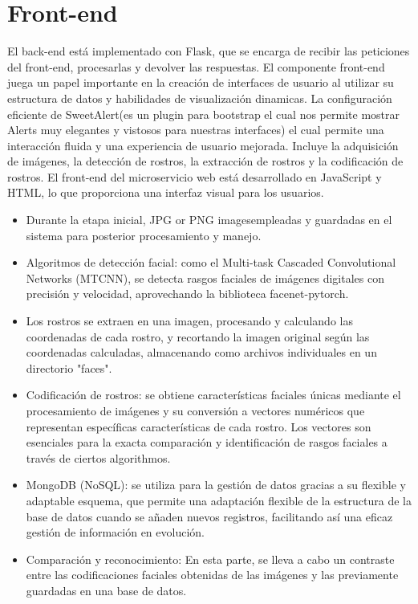 \documentclass[12pt]{article}
\begin{document}
\section{Front-end}
El back-end está implementado con Flask, que se encarga de recibir las peticiones del front-end, procesarlas y devolver las respuestas.
El componente front-end juega un papel importante en la creación de interfaces de usuario al utilizar su estructura de datos y habilidades de visualización dinamicas. La configuración eficiente de SweetAlert(es un plugin para bootstrap el cual nos permite mostrar Alerts muy elegantes y vistosos para nuestras interfaces) el cual permite una interacción fluida y una experiencia de usuario mejorada. Incluye la adquisición de imágenes, la detección de rostros, la extracción de rostros y la codificación de rostros.
El front-end del microservicio web está desarrollado en JavaScript y HTML, lo que proporciona una interfaz visual para los usuarios.
\begin{itemize}
    \item Durante la etapa inicial, JPG or PNG imagesempleadas y guardadas en el sistema para posterior procesamiento y manejo.
    \item Algoritmos de detección facial: como el Multi-task Cascaded Convolutional Networks (MTCNN), se detecta rasgos faciales de imágenes digitales con precisión y velocidad, aprovechando la biblioteca facenet-pytorch.
    \item Los rostros se extraen en una imagen, procesando y calculando las coordenadas de cada rostro, y recortando la imagen original según las coordenadas calculadas, almacenando como archivos individuales en un directorio "faces".
    \item Codificación de rostros: se obtiene características faciales únicas mediante el procesamiento de imágenes y su conversión a  vectores numéricos que representan específicas características de cada rostro. Los vectores son esenciales para la exacta comparación y identificación de rasgos faciales a través de ciertos algorithmos.
    \item MongoDB (NoSQL): se utiliza para la gestión de datos gracias a su flexible y adaptable esquema, que permite una adaptación flexible de la estructura de la base de datos cuando se añaden nuevos registros, facilitando así una eficaz gestión de información en evolución.
    \item Comparación y reconocimiento: En esta parte, se lleva a cabo un contraste entre las codificaciones faciales obtenidas de las imágenes y las previamente guardadas en una base de datos.
\end{itemize}
\end{document}

